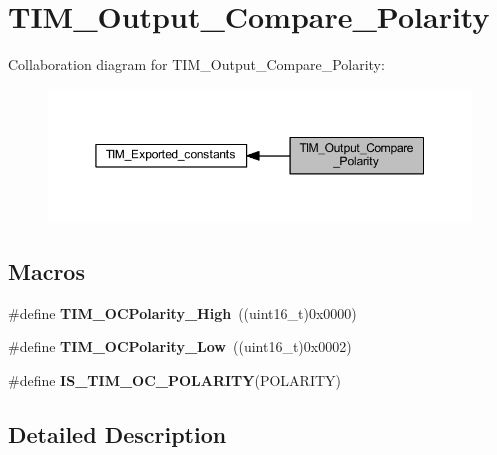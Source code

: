\hypertarget{group___t_i_m___output___compare___polarity}{}\section{T\+I\+M\+\_\+\+Output\+\_\+\+Compare\+\_\+\+Polarity}
\label{group___t_i_m___output___compare___polarity}
Collaboration diagram for T\+I\+M\+\_\+\+Output\+\_\+\+Compare\+\_\+\+Polarity\+:
\nopagebreak
\begin{figure}[H]
\begin{center}
\leavevmode
\includegraphics[width=350pt]{group___t_i_m___output___compare___polarity}
\end{center}
\end{figure}
\subsection*{Macros}
\begin{DoxyCompactItemize}
\item 
\mbox{\label{group___t_i_m___output___compare___polarity_gaba2f2de6fd722b8973e0eddeb8644022}} 
\#define {\bfseries T\+I\+M\+\_\+\+O\+C\+Polarity\+\_\+\+High}~((uint16\+\_\+t)0x0000)
\item 
\mbox{\label{group___t_i_m___output___compare___polarity_ga9f4b11953dbd2c6f836b6913469dcf54}} 
\#define {\bfseries T\+I\+M\+\_\+\+O\+C\+Polarity\+\_\+\+Low}~((uint16\+\_\+t)0x0002)
\item 
\#define {\bfseries I\+S\+\_\+\+T\+I\+M\+\_\+\+O\+C\+\_\+\+P\+O\+L\+A\+R\+I\+TY}(P\+O\+L\+A\+R\+I\+TY)
\end{DoxyCompactItemize}


\subsection{Detailed Description}


